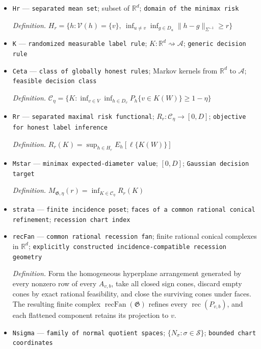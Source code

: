 \documentclass{article}
\begin{document}
\begin{itemize}
  \par\smallskip\noindent\emph{Definition.} \(\mathcal V(h)=\{v\in V:h\in D_v\}\)
  \item \texttt{Hr} --- \texttt{separated mean set}; subset of \(\mathbb R^d\); \texttt{domain of the minimax risk}
  \par\smallskip\noindent\emph{Definition.} \(H_r=\{h:\mathcal V(h)=\{v\},\ \inf_{u\ne v}\inf_{g\in D_u}\|h-g\|_{\Sigma^{-1}}\ge r\}\)
  \item \texttt{K} --- \texttt{randomized measurable label rule}; \(K:\mathbb R^d\rightsquigarrow\mathcal A\); \texttt{generic decision rule}
  \item \texttt{Ceta} --- \texttt{class of globally honest rules}; Markov kernels from \(\mathbb R^d\) to \(\mathcal A\); \texttt{feasible decision class}
  \par\smallskip\noindent\emph{Definition.} \(\mathcal C_{\eta}=\{K:\inf_{v\in V}\inf_{h\in D_v}P_h\{v\in K(W)\}\ge1-\eta\}\)
  \item \texttt{Rr} --- \texttt{separated maximal risk functional}; \(R_r:\mathcal C_{\eta}\to[0,D]\); \texttt{objective for honest label inference}
  \par\smallskip\noindent\emph{Definition.} \(R_r(K)=\sup_{h\in H_r}E_h[\ell\{K(W)\}]\)
  \item \texttt{Mstar} --- \texttt{minimax expected-\allowbreak{}diameter value}; \([0,D]\); \texttt{Gaussian decision target}
  \par\smallskip\noindent\emph{Definition.} \(M_{\mathfrak G,\eta}(r)=\inf_{K\in\mathcal C_{\eta}}R_r(K)\)
  \item \texttt{strata} --- \texttt{finite incidence poset}; \texttt{faces of a common rational conical refinement}; \texttt{recession chart index}
  \item \texttt{recFan} --- \texttt{common rational recession fan}; finite rational conical complexes in \(\mathbb R^d\); \texttt{explicitly constructed incidence-\allowbreak{}compatible recession geometry}
  \par\smallskip\noindent\emph{Definition.} Form the homogeneous hyperplane arrangement generated by every nonzero row of every \(A_{v,b}\), take all closed sign cones, discard empty cones by exact rational feasibility, and close the surviving cones under faces. The resulting finite complex \(\operatorname{recFan}(\mathfrak G)\) refines every \(\operatorname{rec}(P_{v,b})\), and each flattened component retains its projection to \(v\).
  \item \texttt{Nsigma} --- \texttt{family of normal quotient spaces}; \(\{N_{\sigma}:\sigma\in\mathcal S\}\); \texttt{bounded chart coordinates}

\end{itemize}
\end{document}
